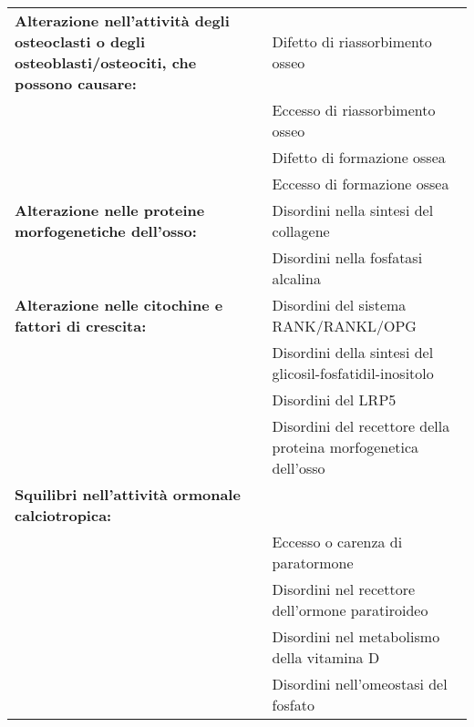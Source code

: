 \documentclass{article}
\begin{document}
\begin{center}
    \begin{tabular}{p{}p{}}
        \toprule
        \textbf{Alterazione nell'attività degli osteoclasti o
        degli osteoblasti/osteociti, che possono
        causare:} & Difetto di riassorbimento osseo \\
        &  Eccesso di riassorbimento osseo \\
        & Difetto di formazione ossea \\
        & Eccesso di formazione ossea\\
        \midrule
        \textbf{Alterazione nelle proteine morfogenetiche dell'osso:} & Disordini nella sintesi del collagene \\
        &  Disordini nella fosfatasi alcalina\\
        \midrule
        \textbf{Alterazione nelle citochine e fattori di crescita:} & Disordini del sistema RANK/RANKL/OPG \\
        & Disordini della sintesi del glicosil-fosfatidil-inositolo \\
        & Disordini del LRP5\\
        & Disordini del recettore della proteina morfogenetica dell'osso\\
        \midrule
        \textbf{Squilibri nell'attività ormonale calciotropica:} & \\
        & Eccesso o carenza di paratormone \\
        & Disordini nel recettore dell'ormone paratiroideo \\
        & Disordini nel metabolismo della vitamina D\\
        & Disordini nell'omeostasi del fosfato\\
        \bottomrule
    \end{tabular}
\end{center}
\end{document}

